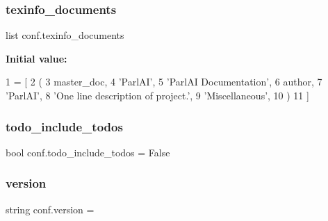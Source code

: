 \mbox{\label{namespaceconf_a54b0faed214ac92017d5689efbb10672}} 
\subsubsection{\texorpdfstring{texinfo\+\_\+documents}{texinfo\_documents}}
{\footnotesize\ttfamily list conf.\+texinfo\+\_\+documents}

{\bfseries Initial value\+:}
\begin{DoxyCode}
1 =  [
2     (
3         master\_doc,
4         \textcolor{stringliteral}{'ParlAI'},
5         \textcolor{stringliteral}{'ParlAI Documentation'},
6         author,
7         \textcolor{stringliteral}{'ParlAI'},
8         \textcolor{stringliteral}{'One line description of project.'},
9         \textcolor{stringliteral}{'Miscellaneous'},
10     )
11 ]
\end{DoxyCode}
\mbox{\label{namespaceconf_a8fe7f0d85f975f4ecba5cb6066959a09}} 
\subsubsection{\texorpdfstring{todo\+\_\+include\+\_\+todos}{todo\_include\_todos}}
{\footnotesize\ttfamily bool conf.\+todo\+\_\+include\+\_\+todos = False}

\mbox{\label{namespaceconf_ade15c5b54093b64d7c428ec19ca5b1cb}} 
\subsubsection{\texorpdfstring{version}{version}}
{\footnotesize\ttfamily string conf.\+version = \textquotesingle{}\textquotesingle{}}

